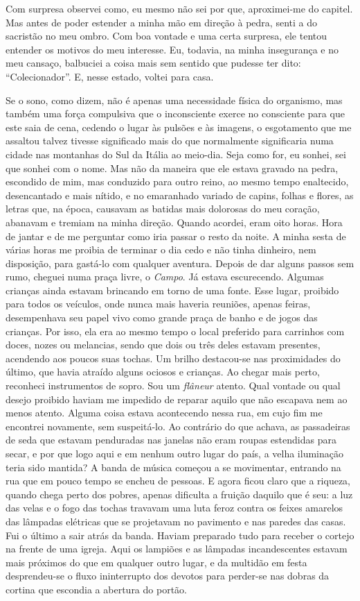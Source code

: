 Com surpresa observei como, eu mesmo não sei por que, aproximei-me do
capitel. Mas antes de poder estender a minha mão em direção à pedra,
senti a do sacristão no meu ombro. Com boa vontade e uma certa surpresa,
ele tentou entender os motivos do meu interesse. Eu, todavia, na minha
insegurança e no meu cansaço, balbuciei a coisa mais sem sentido que
pudesse ter dito: ``Colecionador''. E, nesse estado, voltei para casa.

Se o sono, como dizem, não é apenas uma necessidade física do organismo,
mas também uma força compulsiva que o inconsciente exerce no consciente
para que este saia de cena, cedendo o lugar às pulsões e às imagens, o
esgotamento que me assaltou talvez tivesse significado mais do que
normalmente significaria numa cidade nas montanhas do Sul da Itália ao
meio-dia. Seja como for, eu sonhei, sei que sonhei com o nome. Mas não
da maneira que ele estava gravado na pedra, escondido de mim, mas
conduzido para outro reino, ao mesmo tempo enaltecido, desencantado e
mais nítido, e no emaranhado variado de capins, folhas e flores, as
letras que, na época, causavam as batidas mais dolorosas do meu coração,
abanavam e tremiam na minha direção. Quando acordei, eram oito horas.
Hora de jantar e de me perguntar como iria passar o resto da noite. A
minha sesta de várias horas me proibia de terminar o dia cedo e não
tinha dinheiro, nem disposição, para gastá-lo com qualquer aventura.
Depois de dar alguns passos sem rumo, cheguei numa praça livre, o
\emph{Campo}. Já estava escurecendo. Algumas crianças ainda estavam
brincando em torno de uma fonte. Esse lugar, proibido para todos os
veículos, onde nunca mais haveria reuniões, apenas feiras, desempenhava
seu papel vivo como grande praça de banho e de jogos das crianças. Por
isso, ela era ao mesmo tempo o local preferido para carrinhos com doces,
nozes ou melancias, sendo que dois ou três deles estavam presentes,
acendendo aos poucos suas tochas. Um brilho destacou-se nas proximidades
do último, que havia atraído alguns ociosos e crianças. Ao chegar mais
perto, reconheci instrumentos de sopro. Sou um \emph{flâneur} atento.
Qual vontade ou qual desejo proibido haviam me impedido de reparar
aquilo que não escapava nem ao menos atento. Alguma coisa estava
acontecendo nessa rua, em cujo fim me encontrei novamente, sem
suspeitá-lo. Ao contrário do que achava, as passadeiras de seda que
estavam penduradas nas janelas não eram roupas estendidas para secar, e
por que logo aqui e em nenhum outro lugar do país, a velha iluminação
teria sido mantida? A banda de música começou a se movimentar, entrando
na rua que em pouco tempo se encheu de pessoas. E agora ficou claro que
a riqueza, quando chega perto dos pobres, apenas dificulta a fruição
daquilo que é seu: a luz das velas e o fogo das tochas travavam uma luta
feroz contra os feixes amarelos das lâmpadas elétricas que se projetavam
no pavimento e nas paredes das casas. Fui o último a sair atrás da
banda. Haviam preparado tudo para receber o cortejo na frente de uma
igreja. Aqui os lampiões e as lâmpadas incandescentes estavam mais
próximos do que em qualquer outro lugar, e da multidão em festa
desprendeu-se o fluxo ininterrupto dos devotos para perder-se nas dobras
da cortina que escondia a abertura do portão.

